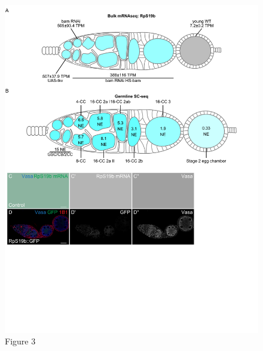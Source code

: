 \documentclass[
]{article}
\begin{document}
\begin{figure}
\centering
\includegraphics{Figure3.pdf}
\caption{Figure 3}
\end{figure}
\end{document}
